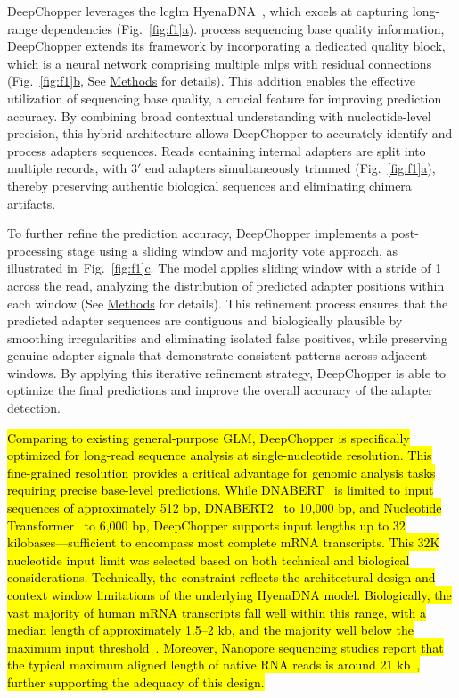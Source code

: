 \documentclass[pdflatex,sn-nature, lineno]{sn-jnl}%
\newcommand{\figref}[2]{Fig.~\hyperref[#1]{\ref*{#1}#2}}
\begin{document}
DeepChopper leverages the \gls{lcglm} HyenaDNA~\cite{nguyen2024hyenadna}, which excels at capturing long-range dependencies (\figref{fig:f1}{a}).
process sequencing base quality information, DeepChopper extends its framework by incorporating a dedicated quality block, which is a neural network comprising multiple \glspl{mlp} with residual connections~\cite{he2015deep} (\figref{fig:f1}{b}, See \hyperref[sec:methods]{Methods} for details).
This addition enables the effective utilization of sequencing base quality, a crucial feature for improving prediction accuracy.
By combining broad contextual understanding with nucleotide-level precision, this hybrid architecture allows DeepChopper to accurately identify and process adapters sequences.
Reads containing internal adapters are split into multiple records, with $3'$ end adapters simultaneously trimmed (\figref{fig:f1}{a}), thereby preserving authentic biological sequences and eliminating chimera artifacts.

To further refine the prediction accuracy, DeepChopper implements a post-processing stage using a sliding window and majority vote approach, as illustrated in~\figref{fig:f1}{c}.
The model applies sliding window with a stride of 1 across the read, analyzing the distribution of predicted adapter positions within each window (See \hyperref[sec:methods]{Methods} for details).
This refinement process ensures that the predicted adapter sequences are contiguous and biologically plausible by smoothing irregularities and eliminating isolated false positives, while preserving genuine adapter signals that demonstrate consistent patterns across adjacent windows.
By applying this iterative refinement strategy, DeepChopper is able to optimize the final predictions and improve the overall accuracy of the adapter detection.

\hl{Comparing to existing general-purpose GLM, DeepChopper is specifically optimized for long-read sequence analysis at single-nucleotide resolution.
This fine-grained resolution provides a critical advantage for genomic analysis tasks requiring precise base-level predictions.
While DNABERT\mbox{~\cite{ji2021dnabert}} is limited to input sequences of approximately 512 bp, DNABERT2\mbox{~\cite{zhou2023dnabert2}} to 10,000 bp, and Nucleotide Transformer\mbox{~\cite{dalla2024nucleotide}} to 6,000 bp, DeepChopper supports input lengths up to 32 kilobases—sufficient to encompass most complete mRNA transcripts.
This 32K nucleotide input limit was selected based on both technical and biological considerations. Technically, the constraint reflects the architectural design and context window limitations of the underlying HyenaDNA model.
Biologically, the vast majority of human mRNA transcripts fall well within this range, with a median length of approximately 1.5–2 kb, and the majority well below the maximum input threshold\mbox{~\cite{lopes2021gene}}.
Moreover, Nanopore sequencing studies report that the typical maximum aligned length of native RNA reads is around 21 kb\mbox{~\cite{workman2019nanopore}}, further supporting the adequacy of this design.}
\end{document}
